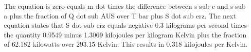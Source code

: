 The equation is zero equals m dot times the difference between s sub e and s sub a plus the fraction of Q dot sub AUS over T bar plus S dot sub erz. The next equation states that S dot sub erz equals negative 0.3 kilograms per second times the quantity 0.9549 minus 1.3069 kilojoules per kilogram Kelvin plus the fraction of 62.182 kilowatts over 293.15 Kelvin. This results in 0.318 kilojoules per Kelvin.